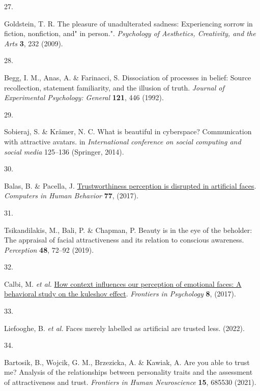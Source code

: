 \documentclass[
  man,floatsintext]{apa6}
\newlength{\cslhangindent}
\newlength{\csllabelwidth}
\newlength{\cslentryspacingunit} %
\newenvironment{CSLReferences}[2] %
 {%
  \setlength{\parindent}{0pt}
  \ifodd #1
  \let\oldpar\par
  \def\par{\hangindent=\cslhangindent\oldpar}
  \fi
  \setlength{\parskip}{#2\cslentryspacingunit}
 }%
 {}
\newcommand{\CSLLeftMargin}[1]{\parbox[t]{\csllabelwidth}{#1}}
\newcommand{\CSLRightInline}[1]{\parbox[t]{\linewidth - \csllabelwidth}{#1}\break}
\begin{document}
\begin{CSLReferences}{0}{0}
\leavevmode{}%
\CSLLeftMargin{27. }%
\CSLRightInline{Goldstein, T. R. The pleasure of unadulterated sadness: Experiencing sorrow in fiction, nonfiction, and" in person.". \emph{Psychology of Aesthetics, Creativity, and the Arts} \textbf{3}, 232 (2009).}

\leavevmode{}%
\CSLLeftMargin{28. }%
\CSLRightInline{Begg, I. M., Anas, A. \& Farinacci, S. Dissociation of processes in belief: Source recollection, statement familiarity, and the illusion of truth. \emph{Journal of Experimental Psychology: General} \textbf{121}, 446 (1992).}

\leavevmode{}%
\CSLLeftMargin{29. }%
\CSLRightInline{Sobieraj, S. \& Krämer, N. C. What is beautiful in cyberspace? Communication with attractive avatars. in \emph{International conference on social computing and social media} 125--136 (Springer, 2014).}

\leavevmode{}%
\CSLLeftMargin{30. }%
\CSLRightInline{Balas, B. \& Pacella, J. \href{https://doi.org/10.1016/j.chb.2017.08.045}{Trustworthiness perception is disrupted in artificial faces}. \emph{Computers in Human Behavior} \textbf{77}, (2017).}

\leavevmode{}%
\CSLLeftMargin{31. }%
\CSLRightInline{Tsikandilakis, M., Bali, P. \& Chapman, P. Beauty is in the eye of the beholder: The appraisal of facial attractiveness and its relation to conscious awareness. \emph{Perception} \textbf{48}, 72--92 (2019).}

\leavevmode{}%
\CSLLeftMargin{32. }%
\CSLRightInline{Calbi, M. \emph{et al.} \href{https://www.frontiersin.org/articles/10.3389/fpsyg.2017.01684}{How context influences our perception of emotional faces: A behavioral study on the kuleshov effect}. \emph{Frontiers in Psychology} \textbf{8}, (2017).}

\leavevmode{}%
\CSLLeftMargin{33. }%
\CSLRightInline{Liefooghe, B. \emph{et al.} Faces merely labelled as artificial are trusted less. (2022).}

\leavevmode{}%
\CSLLeftMargin{34. }%
\CSLRightInline{Bartosik, B., Wojcik, G. M., Brzezicka, A. \& Kawiak, A. Are you able to trust me? Analysis of the relationships between personality traits and the assessment of attractiveness and trust. \emph{Frontiers in Human Neuroscience} \textbf{15}, 685530 (2021).}


\end{CSLReferences}
\end{document}
